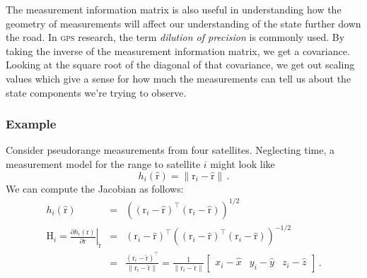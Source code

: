 \documentclass[12pt]{article}
\newcommand*\vect[1]{\mathrm{#1}}
\begin{document}
The measurement information matrix is also useful in understanding how the geometry of measurements will affect our understanding of the state further down the road. In \textsc{gps} research, the term \textit{dilution of precision} is commonly used. By taking the inverse of the measurement information matrix, we get a covariance. Looking at the square root of the diagonal of that covariance, we get out scaling values which give a sense for how much the measurements can tell us about the state components we're trying to observe.

\subsubsection{Example}
Consider pseudorange measurements from four satellites. Neglecting time, a measurement model for the range to satellite $i$ might look like
\begin{equation*}
h_i(\hat{\vect{r}}) = \|\vect{r}_i - \vect{\hat{r}}\|\,\text{.}
\end{equation*}
We can compute the Jacobian as follows:
\begin{eqnarray*}
h_i(\hat{\vect{r}}) &=& \left((\vect{r}_i - \vect{\hat{r}})^\top (\vect{r}_i - \vect{\hat{r}}) \right)^{1/2} \\
\vect{H}_i = \left.\frac{\partial h_i(\vect{r})}{\partial \vect{r}}\right|_{\hat{\vect{r}}} &=& \left(\vect{r}_i - \vect{\hat{r}}\right)^\top \left((\vect{r}_i - \vect{\hat{r}})^\top (\vect{r}_i - \vect{\hat{r}}) \right)^{-1/2} \\
&=& \frac{\left(\vect{r}_i - \vect{\hat{r}}\right)^\top}{\|\vect{r}_i - \vect{\hat{r}}\|} = \frac{1}{\|\vect{r}_i - \vect{\hat{r}}\|} \begin{bmatrix} x_i - \hat{x} & y_i - \hat{y} & z_i - \hat{z} \end{bmatrix}\,\text{.}
\end{eqnarray*}
\end{document}
